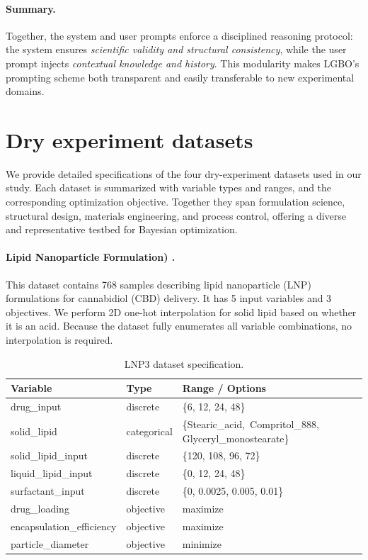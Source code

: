 \documentclass{article} %
\begin{document}
\paragraph{Summary.}  
Together, the system and user prompts enforce a disciplined reasoning protocol: the system ensures \emph{scientific validity and structural consistency}, while the user prompt injects \emph{contextual knowledge and history}. This modularity makes LGBO’s prompting scheme both transparent and easily transferable to new experimental domains.

\section{Dry experiment datasets}
\label{app:datasets}

We provide detailed specifications of the four dry-experiment datasets used in our study. 
Each dataset is summarized with variable types and ranges, and the corresponding optimization objective. 
Together they span formulation science, structural design, materials engineering, and process control, 
offering a diverse and representative testbed for Bayesian optimization.

\paragraph{Lipid Nanoparticle Formulation) \citep{chen2022optimizationlnp3}.}
This dataset contains 768 samples describing lipid nanoparticle (LNP) formulations for cannabidiol (CBD) delivery.  
It has 5 input variables and 3 objectives. We perform 2D one-hot interpolation for solid lipid based on whether it is an acid.
Because the dataset fully enumerates all variable combinations, no interpolation is required.

\begin{table}[h]
\centering
\caption{LNP3 dataset specification.}
\label{tab:lnp3}
\begin{tabular}{lll}
\toprule
Variable & Type & Range / Options \\
\midrule
drug\_input & discrete & \{6, 12, 24, 48\} \\
solid\_lipid & categorical & \{Stearic\_acid,\ Compritol\_888, Glyceryl\_monostearate\} \\
solid\_lipid\_input & discrete & \{120, 108, 96, 72\} \\
liquid\_lipid\_input & discrete & \{0, 12, 24, 48\} \\
surfactant\_input & discrete & \{0, 0.0025, 0.005, 0.01\} \\
\midrule
drug\_loading & objective & maximize \\
encapsulation\_efficiency & objective & maximize \\
particle\_diameter & objective & minimize \\
\bottomrule
\end{tabular}
\end{table}
\end{document}
